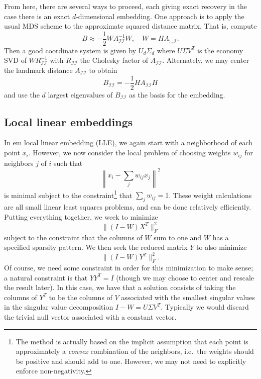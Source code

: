 \documentclass[12pt, leqno]{article} %
\begin{document}
{From here, there are several ways to proceed, each giving exact recovery
in the case there is an exact $d$-dimensional embedding.  One approach
is to apply the usual MDS scheme to the approximate squared
distance matrix.  That is, compute
\[
  B \approx -\frac{1}{2} W A_{\mathcal{I} \mathcal{I}}^{-1} W,
  \quad W = H A_{:,\mathcal{I}}.
\]
Then a good coordinate system is given by $U_d \Sigma_d$ where $U
\Sigma V^T$ is the economy SVD of $W R_{\mathcal{I} \mathcal{I}}^{-1}$
with $R_{\mathcal{I} \mathcal{I}}$ the Cholesky factor of
$A_{\mathcal{I} \mathcal{I}}$.  Alternately, we may center the
landmark distance $A_{\mathcal{I} \mathcal{I}}$ to obtain
\[
  B_{\mathcal{I} \mathcal{I}}
  = -\frac{1}{2} H A_{\mathcal{I} \mathcal{I}} H
\]
and use the $d$ largest eigenvalues of $B_{\mathcal{I} \mathcal{I}}$
as the basis for the embedding.


\subsection{Local linear embeddings}

In {em local linear embedding} (LLE), we again start with a
neighborhood of each point $x_i$.  However, we now consider the local
problem of choosing weights $w_{ij}$ for neighbors $j$ of $i$ such
that
\[
  \left\| x_i - \sum_{j} w_{ij} x_j \right\|^2
\]
is minimal subject to the constraint\footnote{The method is actually
  based on the implicit assumption that each point is approximately a
  {\em convex} combination of the neighbors, i.e.~the weights should
  be positive and should add to one.  However, we may not need to
  explicitly enforce non-negativity.
} that $\sum_j w_{ij} = 1$.
These weight calculations are all small linear least squares
problems, and can be done relatively efficiently.  Putting everything
together, we week to minimize
\[
  \| (I-W) X^T \|_F^2
\]
subject to the constraint that the columns of $W$ sum to one and $W$
has a specified sparsity pattern.  We then seek the reduced matrix $Y$
to also minimize
\[
  \| (I-W) Y^T \|_F^2.
\]
Of course, we need some constraint in order for this minimization to
make sense; a natural constraint is that $Y Y^T = I$ (though we may
choose to center and rescale the result later).  In this case, we have
that a solution consists of taking the columns of $Y^T$ to be the
columns of $V$ associated with the smallest singular values in the
singular value decomposition $I-W = U \Sigma V^T$.  Typically we would
discard the trivial null vector associated with a constant vector.

}
\end{document}
